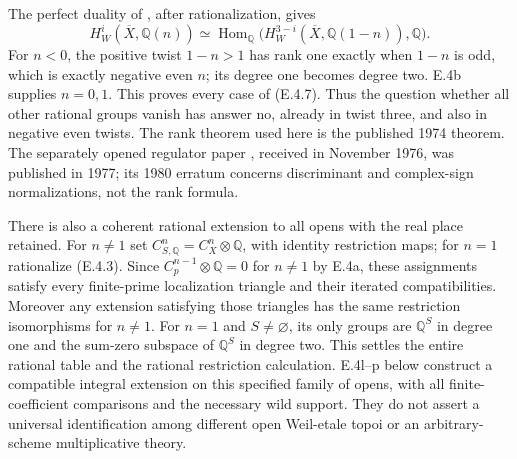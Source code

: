 The perfect duality of \citet[Theorem 3.22]{D_FlachMorin2018},
after rationalization, gives
\[
 H_W^i(\overline X,\mathbb Q(n))
 \simeq
 \operatorname{Hom}_{\mathbb Q}
 \bigl(H_W^{3-i}(\overline X,\mathbb Q(1-n)),\mathbb Q\bigr).
\]
For $n<0$, the positive twist $1-n>1$ has rank one exactly when
$1-n$ is odd, which is exactly negative even $n$; its degree one
becomes degree two. E.4b supplies $n=0,1$. This proves every case
of (E.4.7). Thus the question whether all other rational groups vanish
has answer no, already in twist three, and also in negative even twists.
The rank theorem used here is the published 1974 theorem. The separately
opened regulator paper \citep{D_Borel1977}, received in November 1976,
was published in 1977; its 1980 erratum \citep{D_Borel1980} concerns
discriminant and complex-sign normalizations, not the rank formula.

There is also a coherent rational extension to all opens with the real
place retained. For $n\ne1$ set
$C_{S,\mathbb Q}^n=C_X^n\otimes\mathbb Q$, with identity restriction
maps; for $n=1$ rationalize (E.4.3). Since
$C_p^{n-1}\otimes\mathbb Q=0$ for $n\ne1$ by E.4a, these assignments
satisfy every finite-prime localization triangle and their iterated
compatibilities. Moreover any extension satisfying those triangles has
the same restriction isomorphisms for $n\ne1$. For $n=1$ and
$S\ne\varnothing$, its only groups are $\mathbb Q^S$ in degree one
and the sum-zero subspace of $\mathbb Q^S$ in degree two.
This settles the entire rational table and the rational restriction
calculation. E.4l--p below construct a compatible integral extension
on this specified family of opens, with all finite-coefficient
comparisons and the necessary wild support. They do not assert a
universal identification among different open Weil-etale topoi or
an arbitrary-scheme multiplicative theory.

